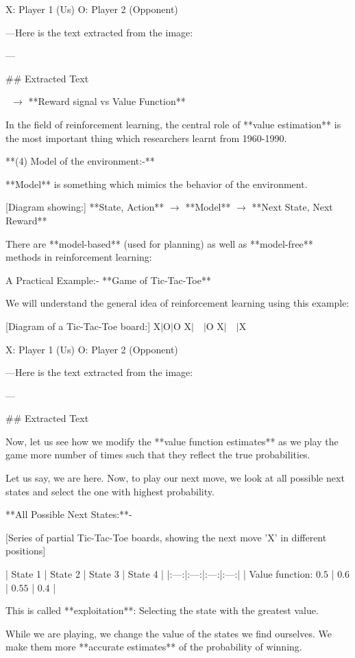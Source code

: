 $\text{X}$: Player 1 (Us)
$\text{O}$: Player 2 (Opponent)

---Here is the text extracted from the image:

---

## Extracted Text

 $\to$ **Reward signal vs Value Function**

In the field of reinforcement learning, the central role of **value estimation** is the most important thing which researchers learnt from 1960-1990.

**(4) Model of the environment:-**

**Model** is something which mimics the behavior of the environment.

[Diagram showing:] **State, Action** $\to$ **Model** $\to$ **Next State, Next Reward**

There are **model-based** (used for planning) as well as **model-free** methods in reinforcement learning:

A Practical Example:- **Game of Tic-Tac-Toe**

We will understand the general idea of reinforcement learning using this example:

[Diagram of a Tic-Tac-Toe board:]
$\text{X}|\text{O}|\text{O}$
$\text{X}|\quad|\text{O}$
$\text{X}|\quad|\text{X}$

$\text{X}$: Player 1 (Us)
$\text{O}$: Player 2 (Opponent)

---Here is the text extracted from the image:

---

## Extracted Text

Now, let us see how we modify the **value function estimates** as we play the game more number of times such that they reflect the true probabilities.


Let us say, we are here. Now, to play our next move, we look at all possible next states and select the one with highest probability.

**All Possible Next States:**-

[Series of partial Tic-Tac-Toe boards, showing the next move 'X' in different positions]

| State 1 | State 2 | State 3 | State 4 |
|:---:|:---:|:---:|:---:|
| Value function: $\text{0.5}$ | $\text{0.6}$ | $\text{0.55}$ | $\text{0.4}$ |

This is called **exploitation**: Selecting the state with the greatest value.

While we are playing, we change the value of the states we find ourselves. We make them more **accurate estimates** of the probability of winning.

